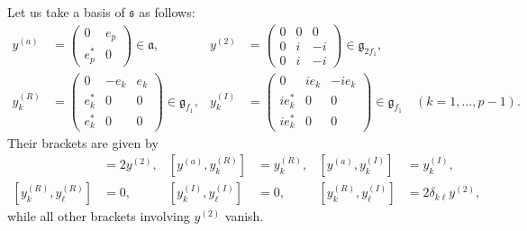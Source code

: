 \documentclass[a4paper,11pt]{amsart}
\newcommand{\fr}[1]{\mathfrak{#1}}
\theoremstyle{definition}
\theoremstyle{remark}
\begin{document}
Let us take a basis of $\fr{s}$ as follows:
\begin{align*}
y^{(a)} &= \begin{pmatrix}
 0 & e_p \\ e_p^* & 0 
\end{pmatrix}
 \in \fr{a} ,&
y^{(2)} &= \begin{pmatrix}
 0 & 0 & 0 \\ 0 & i & -i \\ 0 & i & -i 
\end{pmatrix}
 \in \fr{g}_{2f_1} , \\
y^{(R)}_k &= \begin{pmatrix}
 0 & - e_k & e_k \\ e_k^* & 0 & 0 \\ e_k^* & 0 & 0 
\end{pmatrix}
 \in \fr{g}_{f_1},&
y^{(I)}_k &= \begin{pmatrix}
 0 & i e_k & - i e_k \\ i e_k^* & 0 & 0 \\ i e_k^* & 0 & 0 
\end{pmatrix}
 \in \fr{g}_{f_1} \quad (k = 1 , \dots , p -1).
\end{align*}
Their brackets are given by
\begin{align*}
[y^{(a)}, y^{(2)}] &= 2 y^{(2)}, &
[y^{(a)}, y^{(R)}_k] &= y^{(R)}_k,&
[y^{(a)}, y^{(I)}_k] &= y^{(I)}_k,\\
\left[ y^{(R)}_k , y^{(R)}_\ell \right] &= 0 , &
\left[ y^{(I)}_k , y^{(I)}_\ell \right] &= 0 , &
\left[ y^{(R)}_k , y^{(I)}_\ell \right] &= 2 \delta_{k\ell} y^{(2)},
\end{align*}
while all other brackets involving $y^{(2)}$ vanish.
\end{document}
